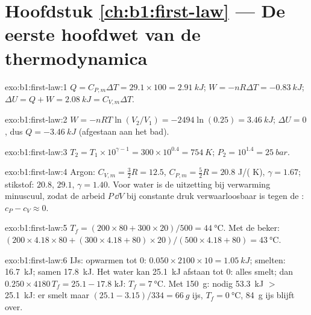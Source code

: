 \section*{Hoofdstuk \ref{ch:b1:first-law} --- De eerste hoofdwet van de thermodynamica}

\begin{solution}{exo:b1:first-law:1}
$Q = C_{P,m}\Delta T = 29.1 \times 100 = \qty{2.91}{kJ}$; $W = -nR\Delta T =
\qty{-0.83}{kJ}$; $\Delta U = Q + W = \qty{2.08}{kJ} = C_{V,m}\Delta T$.
\end{solution}

\begin{solution}{exo:b1:first-law:2}
$W = -nRT\ln(V_2/V_1) = -2494\ln(0.25) = \qty{+3.46}{kJ}$; $\Delta U = 0$, dus
$Q = \qty{-3.46}{kJ}$ (afgestaan aan het bad).
\end{solution}

\begin{solution}{exo:b1:first-law:3}
$T_2 = T_1 \times 10^{\gamma - 1} = 300 \times 10^{0.4} = \qty{754}{K}$; $P_2 =
10^{1.4} = \qty{25}{bar}$.
\end{solution}

\begin{solution}{exo:b1:first-law:4}
Argon: $C_{V,m} = \tfrac32 R = 12.5$, $C_{P,m} = \tfrac52 R = 20.8$ J/( K),
$\gamma = 1.67$; stikstof: $20.8$, $29.1$, $\gamma = 1.40$. Voor water is de
uitzetting bij verwarming minuscuul, zodat de arbeid $P\,\dd V$ bij constante druk
verwaarloosbaar is tegen de : $c_P - c_V \approx 0$.
\end{solution}

\begin{solution}{exo:b1:first-law:5}
$T_f = (200 \times 80 + 300 \times 20)/500 = \qty{44}{\degreeCelsius}$. Met de
beker: $(200 \times 4.18 \times 80 + (300 \times 4.18 + 80) \times 20)/(500 \times
4.18 + 80) = \qty{43}{\degreeCelsius}$.
\end{solution}

\begin{solution}{exo:b1:first-law:6}
IJs: opwarmen tot $0$: $0.050 \times 2100 \times 10 = \qty{1.05}{kJ}$; smelten:
\qty{16.7}{kJ}; samen \qty{17.8}{kJ}. Het water kan \qty{25.1}{kJ} afstaan tot
$0$: alles smelt; dan $0.250 \times 4180\,T_f = 25.1 - 17.8$ kJ: $T_f =
\qty{7}{\degreeCelsius}$. Met \qty{150}{g}: nodig \qty{53.3}{kJ} $>$ \qty{25.1}{kJ}:
er smelt maar $(25.1 - 3.15)/334 = \qty{66}{g}$ ijs, $T_f = \qty{0}{\degreeCelsius}$,
\qty{84}{g} ijs blijft over.
\end{solution}

